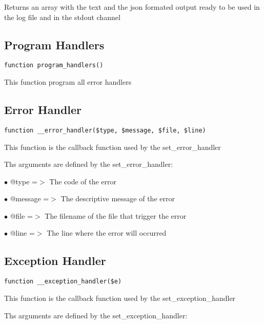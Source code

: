 \documentclass[a4paper]{book}
\begin{document}
Returns an array with the text and the json formated output ready to be used
in the log file and in the stdout channel

\hypertarget{toc107}{}
\subsection{Program Handlers}

\begin{lstlisting}
function program_handlers()
\end{lstlisting}

This function program all error handlers

\hypertarget{toc108}{}
\subsection{Error Handler}

\begin{lstlisting}
function __error_handler($type, $message, $file, $line)
\end{lstlisting}

This function is the callback function used by the set\_error\_handler

Ths arguments are defined by the set\_error\_handler:

\begin{compactitem}
\item[\color{myblue}$\bullet$] @type    =$>$ The code of the error
\item[\color{myblue}$\bullet$] @message =$>$ The descriptive message of the error
\item[\color{myblue}$\bullet$] @file    =$>$ The filename of the file that trigger the error
\item[\color{myblue}$\bullet$] @line    =$>$ The line where the error will occurred
\end{compactitem}

\hypertarget{toc109}{}
\subsection{Exception Handler}

\begin{lstlisting}
function __exception_handler($e)
\end{lstlisting}

This function is the callback function used by the set\_exception\_handler

Ths arguments are defined by the set\_exception\_handler:
\end{document}
